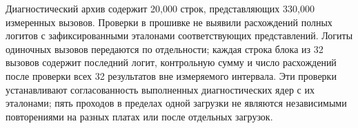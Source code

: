 Диагностический архив содержит 20,000 строк, представляющих 330,000 измеренных вызовов. Проверки в прошивке не выявили расхождений полных логитов с зафиксированными эталонами соответствующих представлений. Логиты одиночных вызовов передаются по отдельности; каждая строка блока из 32 вызовов содержит последний логит, контрольную сумму и число расхождений после проверки всех 32 результатов вне измеряемого интервала. Эти проверки устанавливают согласованность выполненных диагностических ядер с их эталонами; пять проходов в пределах одной загрузки не являются независимыми повторениями на разных платах или после отдельных загрузок.
